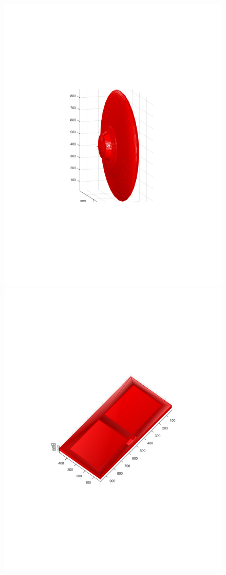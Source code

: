 \documentclass{UCF_ETD}
\begin{document}
\begin{figure}[H]
\begin{center}
\includegraphics[scale=0.34]{RobustRegistration/NoiselessAnomalies2}
\includegraphics[scale=0.34]{RobustRegistration/NoiselessAnomalies3}

\end{center}
\end{figure}
\end{document}
